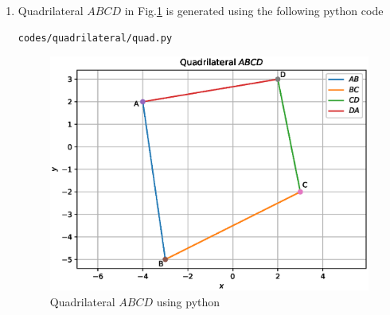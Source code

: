 \begin{enumerate}[label=\arabic*.,ref=\thesubsection.\theenumi]
\item Quadrilateral $ABCD$ in Fig.\ref{fig:quad_1} is generated using the following python code 
\begin{lstlisting}
codes/quadrilateral/quad.py
\end{lstlisting}
\begin{figure}[!ht]
\centering
\includegraphics[width=\columnwidth]{./codes/quadrilateral/quad.eps}
\caption{Quadrilateral $ABCD$ using python}
\label{fig:quad_1}
\end{figure} 
\end{enumerate}